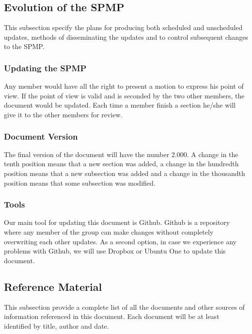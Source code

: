 \documentclass[12pt]{article}
\begin{document}
\subsection{Evolution of the SPMP}
This subsection specify the plans for producing both scheduled and unscheduled updates, methods of disseminating the updates and to control subsequent changes to the SPMP.
\subsubsection{Updating the SPMP}
Any member would have all the right to present a motion to express his point of view.  If the point of view is valid and is seconded by the two other members, the document would be updated. Each time a member finish a section he/she will give it to the other members for review.

\subsubsection{Document Version}
The final version of the document will have the number 2.000. A change in the tenth position means that a new section was added, a change in the hundredth position means that a new subsection was added and a change in the thousandth position means that some subsection was modified.

\subsubsection{Tools}
Our main tool for updating this document is Github. Github is a repository where any member of the group can make changes without completely overwriting each other updates. As a second option, in case we experience any problems with Github, we will use Dropbox or Ubuntu One to update this document.

\subsection{Reference Material}
This subsection provide a complete list of all the documents and other sources of information referenced in this document. Each document will be at least identified by title, author and date.
\end{document}
